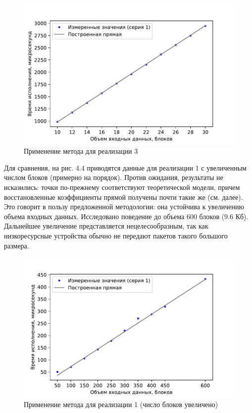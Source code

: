 \begin{figure}[ht!] 
	\includegraphics [scale=1.1] {my_folder/plots/plot3_notitle}
	\centering
	\caption{Применение метода для реализации 3} 
\end{figure}

Для сравнения, на рис. 4.4 приводятся данные для реализации 1 с увеличенным числом блоков (примерно на порядок). Против ожидания, результаты не исказились: точки по-прежнему соответствуют теоретической модели, причем восстановленные коэффициенты прямой получены почти такие же (см. далее). Это говорит в пользу предложенной методологии: она устойчива к увеличению объема входных данных. Исследовано поведение до объема 600 блоков (9.6 Кб). Дальнейшее увеличение представляется нецелесообразным, так как низкоресурсные устройства обычно не передают пакетов такого большого размера.

\begin{figure}[ht!] 
	\includegraphics [scale=1.1] {my_folder/plots/plot4_notitle}
	\centering
	\caption{Применение метода для реализации 1 (число блоков увеличено)} 
\end{figure}

